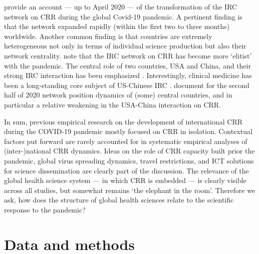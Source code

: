 \cite{zhang2020scientific,haghani2020covid,fry2020consolidation} provide an account --- up to April 2020 --- of the transformation of the IRC network on CRR during the global Covid-19 pandemic. A pertinent finding is that the network expanded rapidly (within the first two to three months) worldwide. Another common finding is that countries are extremely heterogeneous not only in terms of individual science production but also their network centrality. \cite{fry2020consolidation,cai2021international} note that the IRC network on CRR has become more `elitist' with the pandemic. The central role of two countries, USA and China, and their strong IRC interaction has been emphasized \citep[e.g][]{fry2020consolidation}. Interestingly, clinical medicine has been a long-standing core subject of US-Chinese IRC \citep[shown for the period 2000 to 2010 by][]{niu2014network}. \cite{cai2021international} document for the second half of 2020 network position dynamics of (some) central countries, and in particular a relative weakening in the USA-China interaction on CRR. 

In sum, previous empirical research on the development of international CRR during the COVID-19 pandemic mostly focused on CRR in isolation. Contextual factors put forward are rarely accounted for in systematic empirical analyses of (inter-)national CRR dynamics. Ideas on the role of CRR capacity built prior the pandemic, global virus spreading dynamics, travel restrictions, and ICT solutions for science dissemination are clearly part of the discussion. The relevance of the global health science system --- in which CRR is embedded --- is clearly visible across all studies, but somewhat remains `the elephant in the room'. Therefore we ask, how does the structure of global health sciences relate to the scientific response to the pandemic? 




\section{Data and methods}


